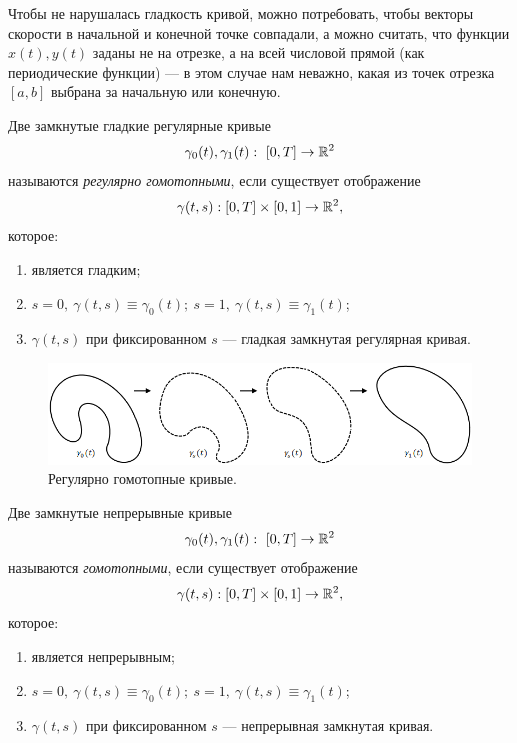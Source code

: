 \begin{remark}
    Чтобы не нарушалась гладкость кривой, можно потребовать, чтобы векторы скорости в начальной и конечной точке совпадали, а можно считать, что функции $x(t), y(t)$ заданы не на отрезке, а на всей числовой прямой (как периодические функции) — в этом случае нам неважно, какая из точек отрезка $[a,b]$ выбрана за начальную или конечную.
\end{remark}

\begin{definition}
    Две замкнутые гладкие регулярные кривые $$\gamma_0(t), \gamma_1(t): \ [0, T] \to \mathbb{R}^2$$ называются \textit{регулярно гомотопными}, если существует отображение $$\gamma(t,s): [0, T] \times [0,1] \to \mathbb{R}^2,$$ которое:
    \begin{enumerate}
        \item является гладким;
        \item $s = 0, \ \gamma(t,s) \equiv \gamma_0(t); \ s = 1,\ \gamma(t,s) \equiv \gamma_1(t)$;
        \item $\gamma(t,s)$ при фиксированном $s$ — гладкая замкнутая регулярная кривая.
    \end{enumerate}
\end{definition} 

\begin{figure}[htbp]
    \centering
    \includegraphics[scale=0.5]{images/c12.4.png}
    \caption{Регулярно гомотопные кривые.}
    \label{fig:c12.4}
\end{figure}

\begin{definition}
    Две замкнутые непрерывные кривые $$\gamma_0(t), \gamma_1(t): \ [0, T] \to \mathbb{R}^2$$ называются \textit{гомотопными}, если существует отображение $$\gamma(t,s): [0, T] \times [0,1] \to \mathbb{R}^2,$$ которое:
    \begin{enumerate}
        \item является непрерывным;
        \item $s = 0, \ \gamma(t,s) \equiv \gamma_0(t); \ s = 1,\ \gamma(t,s) \equiv \gamma_1(t)$;
        \item $\gamma(t,s)$ при фиксированном $s$ — непрерывная замкнутая кривая.
    \end{enumerate}
\end{definition} 

